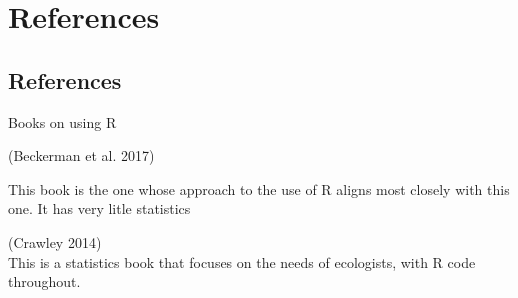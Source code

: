 \documentclass[
  letterpaper,
  DIV=11,
  numbers=noendperiod]{scrreprt}
\begin{document}
\part{References}

\chapter*{References}\label{references-1}


Books on using R

(Beckerman et al. 2017)

This book is the one whose approach to the use of R aligns most closely
with this one. It has very litle statistics

(Crawley 2014)\\
This is a statistics book that focuses on the needs of ecologists, with
R code throughout.
\end{document}
